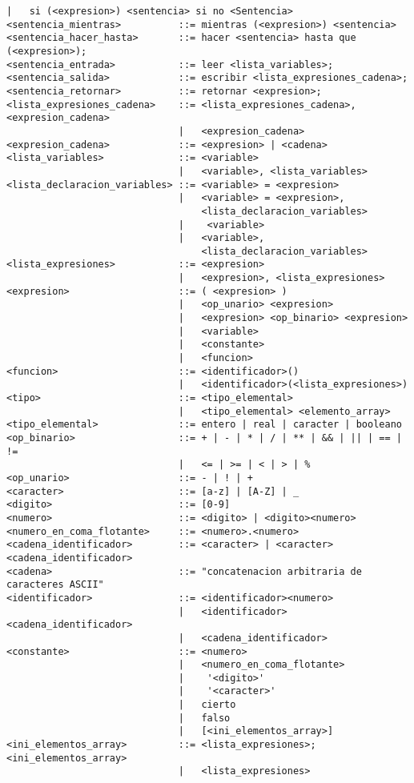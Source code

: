 \begin{lstlisting}[breaklines=true, basicstyle=\tiny]
                              |   si (<expresion>) <sentencia> si no <Sentencia>
<sentencia_mientras>          ::= mientras (<expresion>) <sentencia>
<sentencia_hacer_hasta>       ::= hacer <sentencia> hasta que (<expresion>);
<sentencia_entrada>           ::= leer <lista_variables>;
<sentencia_salida>            ::= escribir <lista_expresiones_cadena>;
<sentencia_retornar>          ::= retornar <expresion>;
<lista_expresiones_cadena>    ::= <lista_expresiones_cadena>, <expresion_cadena>
                              |   <expresion_cadena>
<expresion_cadena>            ::= <expresion> | <cadena>
<lista_variables>             ::= <variable>
                              |   <variable>, <lista_variables>
<lista_declaracion_variables> ::= <variable> = <expresion>
                              |   <variable> = <expresion>,
                                  <lista_declaracion_variables>
                              |    <variable>
                              |   <variable>,
                                  <lista_declaracion_variables>
<lista_expresiones>           ::= <expresion>
                              |   <expresion>, <lista_expresiones>
<expresion>                   ::= ( <expresion> )
                              |   <op_unario> <expresion>
                              |   <expresion> <op_binario> <expresion>
                              |   <variable>
                              |   <constante>
                              |   <funcion>
<funcion>                     ::= <identificador>()
                              |   <identificador>(<lista_expresiones>)
<tipo>                        ::= <tipo_elemental>
                              |   <tipo_elemental> <elemento_array>
<tipo_elemental>              ::= entero | real | caracter | booleano
<op_binario>                  ::= + | - | * | / | ** | && | || | == | !=
                              |   <= | >= | < | > | %
<op_unario>                   ::= - | ! | +
<caracter>                    ::= [a-z] | [A-Z] | _
<digito>                      ::= [0-9]
<numero>                      ::= <digito> | <digito><numero>
<numero_en_coma_flotante>     ::= <numero>.<numero>
<cadena_identificador>        ::= <caracter> | <caracter><cadena_identificador>
<cadena>                      ::= "concatenacion arbitraria de caracteres ASCII"
<identificador>               ::= <identificador><numero>
                              |   <identificador><cadena_identificador>
                              |   <cadena_identificador>
<constante>                   ::= <numero>
                              |   <numero_en_coma_flotante>
                              |    '<digito>'
                              |    '<caracter>'
                              |   cierto
                              |   falso
                              |   [<ini_elementos_array>]
<ini_elementos_array>         ::= <lista_expresiones>; <ini_elementos_array>
                              |   <lista_expresiones>
\end{lstlisting}


